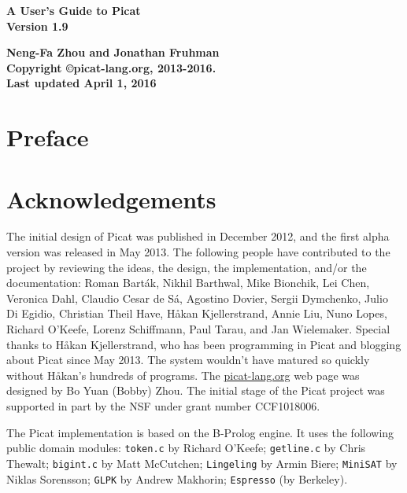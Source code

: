 \documentclass[11pt]{report}
\newcommand{\ignore}[1]{}
\begin{document}
\vspace*{4cm}
\begin{center}
{\Huge\bf A User's Guide to Picat} \\
{\large\bf Version 1.9} \\



\vspace*{8cm}

{\large\bf Neng-Fa Zhou and Jonathan Fruhman} \\
\vspace*{1cm}
{\bf Copyright \copyright picat-lang.org, 2013-2016.} \\
{\bf Last updated April 1, 2016} \\
\end{center}
\thispagestyle{empty}
\clearpage

\pagestyle{plain}

\section*{Preface}


\section*{Acknowledgements}
The initial design of Picat was published in December 2012, and the first alpha version was released in May 2013.  The following people have contributed to the project by reviewing the ideas, the design, the implementation, and/or the documentation: Roman Bart\'{a}k, Nikhil Barthwal, Mike Bionchik, Lei Chen, Veronica Dahl, Claudio Cesar de S\'{a}, Agostino Dovier, Sergii Dymchenko, Julio Di Egidio, Christian Theil Have, H{\aa}kan Kjellerstrand,  Annie Liu, Nuno Lopes, Richard O'Keefe, Lorenz Schiffmann, Paul Tarau, and Jan Wielemaker.  Special thanks to H{\aa}kan Kjellerstrand, who has been programming in Picat and blogging about Picat since May 2013. The system wouldn't have matured so quickly without H{\aa}kan's hundreds of programs. The \url{picat-lang.org} web page was designed by Bo Yuan (Bobby) Zhou. The initial stage of the Picat project was supported in part by the NSF under grant number CCF1018006.

The Picat implementation is based on the B-Prolog engine. It uses the following public domain modules: \ignore{\texttt{prism} by Taisuke Sato and Yoshitaka Kameya; }\texttt{token.c} by Richard O'Keefe; \texttt{getline.c} by Chris Thewalt; \texttt{bigint.c} by Matt McCutchen; \texttt{Lingeling} by Armin Biere; \texttt{MiniSAT} by Niklas Sorensson; \texttt{GLPK} by Andrew Makhorin; \texttt{Espresso} (by Berkeley).
\end{document}
